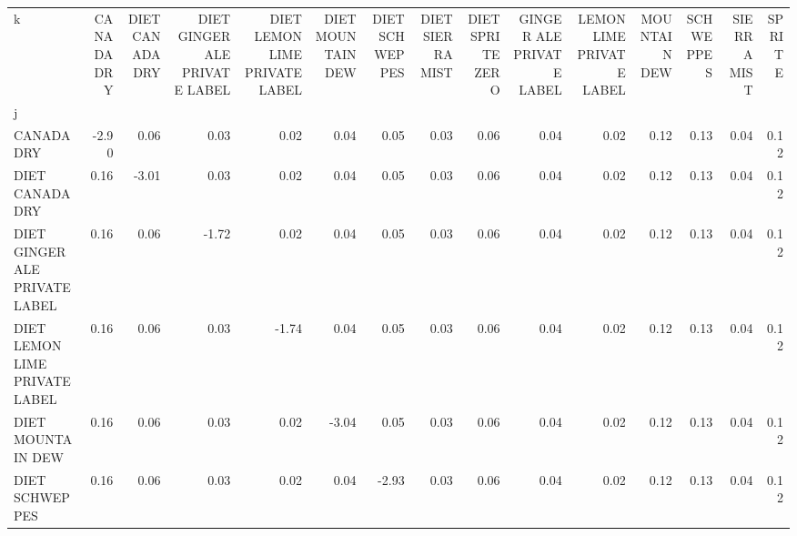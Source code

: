 \begin{tabular}{lrrrrrrrrrrrrrr}
\toprule
k &  CANADA DRY &  DIET CANADA DRY &  DIET GINGER ALE PRIVATE LABEL &  DIET LEMON LIME PRIVATE LABEL &  DIET MOUNTAIN DEW &  DIET SCHWEPPES &  DIET SIERRA MIST &  DIET SPRITE ZERO &  GINGER ALE PRIVATE LABEL &  LEMON LIME PRIVATE LABEL &  MOUNTAIN DEW &  SCHWEPPES &  SIERRA MIST &  SPRITE \\
j                             &             &                  &                                &                                &                    &                 &                   &                   &                           &                           &               &            &              &         \\
\midrule
CANADA DRY                    &       -2.90 &             0.06 &                           0.03 &                           0.02 &               0.04 &            0.05 &              0.03 &              0.06 &                      0.04 &                      0.02 &          0.12 &       0.13 &         0.04 &    0.12 \\
DIET CANADA DRY               &        0.16 &            -3.01 &                           0.03 &                           0.02 &               0.04 &            0.05 &              0.03 &              0.06 &                      0.04 &                      0.02 &          0.12 &       0.13 &         0.04 &    0.12 \\
DIET GINGER ALE PRIVATE LABEL &        0.16 &             0.06 &                          -1.72 &                           0.02 &               0.04 &            0.05 &              0.03 &              0.06 &                      0.04 &                      0.02 &          0.12 &       0.13 &         0.04 &    0.12 \\
DIET LEMON LIME PRIVATE LABEL &        0.16 &             0.06 &                           0.03 &                          -1.74 &               0.04 &            0.05 &              0.03 &              0.06 &                      0.04 &                      0.02 &          0.12 &       0.13 &         0.04 &    0.12 \\
DIET MOUNTAIN DEW             &        0.16 &             0.06 &                           0.03 &                           0.02 &              -3.04 &            0.05 &              0.03 &              0.06 &                      0.04 &                      0.02 &          0.12 &       0.13 &         0.04 &    0.12 \\
DIET SCHWEPPES                &        0.16 &             0.06 &                           0.03 &                           0.02 &               0.04 &           -2.93 &              0.03 &              0.06 &                      0.04 &                      0.02 &          0.12 &       0.13 &         0.04 &    0.12 \\

\end{tabular}
